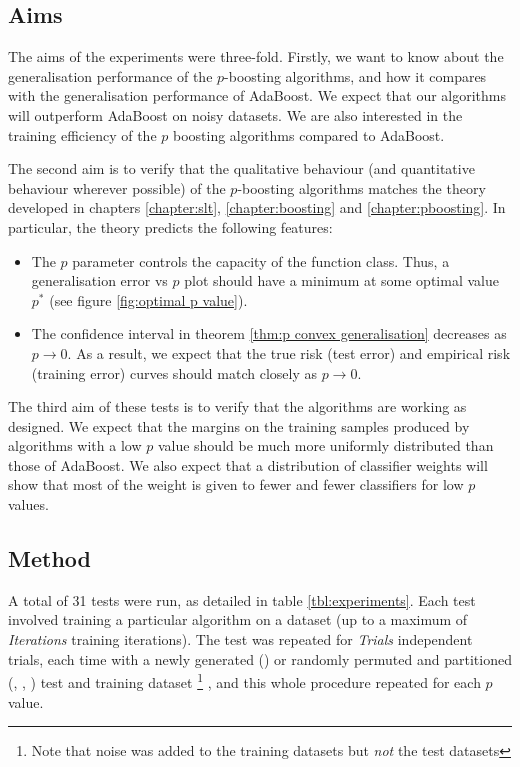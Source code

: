 \subsection{Aims}
The aims of the experiments were three-fold.  Firstly, we want to know
about the generalisation performance of the $p$-boosting algorithms,
and how it compares with the generalisation performance of AdaBoost.
We expect that our algorithms will outperform AdaBoost on noisy
datasets.  We are also interested in the training efficiency of the
$p$ boosting algorithms compared to AdaBoost.

The second aim is to verify that the qualitative behaviour (and
quantitative behaviour wherever possible) of the $p$-boosting
algorithms matches the theory developed in chapters \ref{chapter:slt},
\ref{chapter:boosting} and \ref{chapter:pboosting}.  In particular,
the theory predicts the following features:
\begin{itemize}
\item	The $p$ parameter controls the capacity of the function
	class.  Thus, a generalisation error vs $p$ plot should have a
	minimum at some optimal value $p^{\ast}$ (see figure
	\ref{fig:optimal p value}).

\item	The confidence interval in theorem \ref{thm:p convex
	generalisation} decreases as $p \rightarrow 0$.  As a result,
	we expect that the true risk (test error) and empirical risk
	(training error) curves should match closely as $p \rightarrow
	0$.
\end{itemize}

The third aim of these tests is to verify that the algorithms are
working as designed.  We expect that the margins on the training
samples produced by algorithms with a low $p$ value should be much
more  uniformly distributed than those of AdaBoost.  We also expect
that a distribution of classifier weights will show that most of the
weight is given to fewer and fewer classifiers for low $p$ values.


\subsection{Method}

A total of 31 tests were run, as detailed in table
\ref{tbl:experiments}.  Each test involved training a particular
algorithm on a dataset (up to a maximum of \emph{Iterations} training
iterations).  The test was repeated for \emph{Trials} independent
trials, each time with a newly generated () or randomly
permuted and partitioned (, , )
test and training dataset%
\footnote{Note that noise was added to the training 
datasets but \emph{not} the test  datasets}%
, and this whole procedure repeated for each $p$ value.

